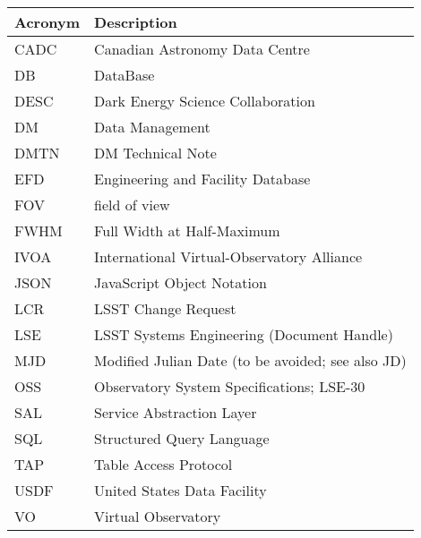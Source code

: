 \addtocounter{table}{-1}
\begin{longtable}{p{}p{}}\hline
\textbf{Acronym} & \textbf{Description}  \\\hline

CADC & Canadian Astronomy Data Centre \\\hline
DB & DataBase \\\hline
DESC & Dark Energy Science Collaboration \\\hline
DM & Data Management \\\hline
DMTN & DM Technical Note \\\hline
EFD & Engineering and Facility Database \\\hline
FOV & field of view \\\hline
FWHM & Full Width at Half-Maximum \\\hline
IVOA & International Virtual-Observatory Alliance \\\hline
JSON & JavaScript Object Notation \\\hline
LCR & LSST Change Request \\\hline
LSE & LSST Systems Engineering (Document Handle) \\\hline
MJD & Modified Julian Date (to be avoided; see also JD) \\\hline
OSS & Observatory System Specifications; LSE-30 \\\hline
SAL & Service Abstraction Layer \\\hline
SQL & Structured Query Language \\\hline
TAP & Table Access Protocol \\\hline
USDF & United States Data Facility \\\hline
VO & Virtual Observatory \\\hline
\end{longtable}
